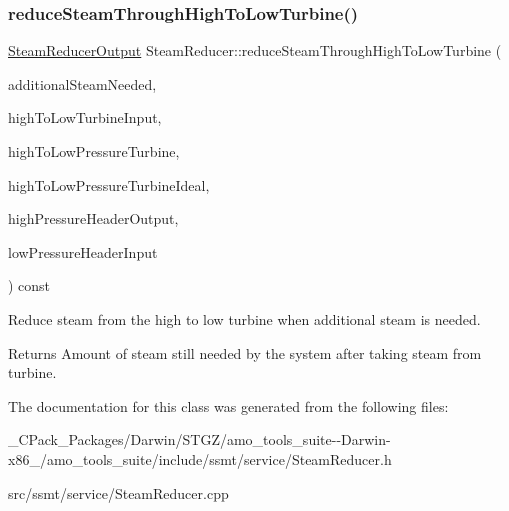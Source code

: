 \subsubsection{\texorpdfstring{reduce\+Steam\+Through\+High\+To\+Low\+Turbine()}{reduceSteamThroughHighToLowTurbine()}\hspace{0.1cm}{\footnotesize\ttfamily [3/3]}}
{\footnotesize\ttfamily \hyperlink{class_steam_reducer_output}{Steam\+Reducer\+Output} Steam\+Reducer\+::reduce\+Steam\+Through\+High\+To\+Low\+Turbine (\begin{DoxyParamCaption}\item[{const double}]{additional\+Steam\+Needed,  }\item[{const \hyperlink{class_pressure_turbine}{Pressure\+Turbine} \&}]{high\+To\+Low\+Turbine\+Input,  }\item[{const std\+::shared\+\_\+ptr$<$ \hyperlink{class_turbine}{Turbine} $>$ \&}]{high\+To\+Low\+Pressure\+Turbine,  }\item[{const std\+::shared\+\_\+ptr$<$ \hyperlink{class_turbine}{Turbine} $>$ \&}]{high\+To\+Low\+Pressure\+Turbine\+Ideal,  }\item[{const \hyperlink{struct_steam_system_modeler_tool_1_1_fluid_properties}{Steam\+System\+Modeler\+Tool\+::\+Fluid\+Properties} \&}]{high\+Pressure\+Header\+Output,  }\item[{const std\+::shared\+\_\+ptr$<$ \hyperlink{class_header_not_highest_pressure}{Header\+Not\+Highest\+Pressure} $>$ \&}]{low\+Pressure\+Header\+Input }\end{DoxyParamCaption}) const}

Reduce steam from the high to low turbine when additional steam is needed. \begin{DoxyReturn}{Returns}
Amount of steam still needed by the system after taking steam from turbine. 
\end{DoxyReturn}


The documentation for this class was generated from the following files\+:\begin{DoxyCompactItemize}
\item 
\+\_\+\+C\+Pack\+\_\+\+Packages/\+Darwin/\+S\+T\+G\+Z/amo\+\_\+tools\+\_\+suite-\/-\/\+Darwin-\/x86\+\_/amo\+\_\+tools\+\_\+suite/include/ssmt/service/Steam\+Reducer.\+h\item 
src/ssmt/service/Steam\+Reducer.\+cpp\end{DoxyCompactItemize}

